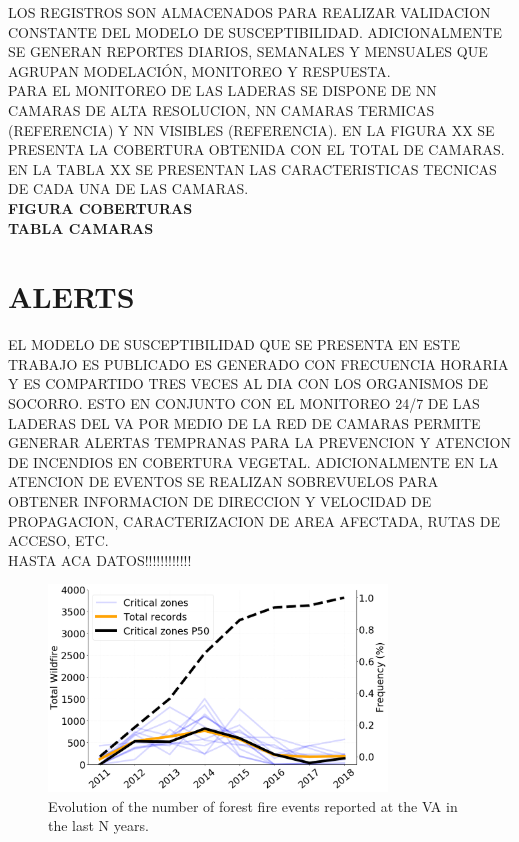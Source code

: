 LOS REGISTROS SON ALMACENADOS PARA REALIZAR VALIDACION CONSTANTE DEL MODELO DE SUSCEPTIBILIDAD. ADICIONALMENTE SE GENERAN REPORTES DIARIOS, SEMANALES Y MENSUALES QUE AGRUPAN MODELACIÓN, MONITOREO Y RESPUESTA.\\

PARA EL MONITOREO DE LAS LADERAS SE DISPONE DE NN CAMARAS DE ALTA RESOLUCION, NN CAMARAS TERMICAS (REFERENCIA) Y NN VISIBLES (REFERENCIA). EN LA FIGURA XX SE PRESENTA LA COBERTURA OBTENIDA CON EL TOTAL DE CAMARAS. EN LA TABLA XX SE PRESENTAN LAS CARACTERISTICAS TECNICAS DE CADA UNA DE LAS CAMARAS.\\

\textbf{FIGURA COBERTURAS}\\
\textbf{TABLA CAMARAS}

\section*{ALERTS}

EL MODELO DE SUSCEPTIBILIDAD QUE SE PRESENTA EN ESTE TRABAJO ES PUBLICADO ES GENERADO CON FRECUENCIA HORARIA Y ES COMPARTIDO TRES VECES AL DIA CON LOS ORGANISMOS DE SOCORRO. ESTO EN CONJUNTO CON EL MONITOREO 24/7 DE LAS LADERAS DEL VA POR MEDIO DE LA RED DE CAMARAS PERMITE GENERAR ALERTAS TEMPRANAS PARA LA PREVENCION Y ATENCION DE INCENDIOS EN COBERTURA VEGETAL. ADICIONALMENTE EN LA ATENCION DE EVENTOS SE REALIZAN SOBREVUELOS PARA OBTENER INFORMACION DE DIRECCION Y VELOCIDAD DE PROPAGACION, CARACTERIZACION DE AREA AFECTADA, RUTAS DE ACCESO, ETC.\\

HASTA ACA DATOS!!!!!!!!!!!!


\begin{figure}[h]
\centering
\includegraphics[width=9.0cm]{Figuras/historical_wildfire.png}
\caption{Evolution of the number of forest fire events reported at the VA in the last N years.}
\label{fig:incendiosAno}
\end{figure}

